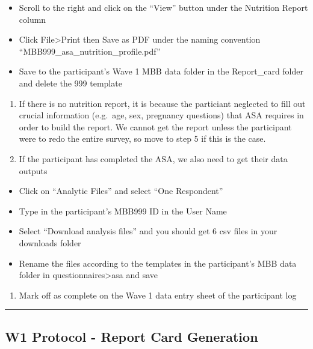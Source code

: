\documentclass[]{book}
\providecommand{\tightlist}{%
  \setlength{\itemsep}{0pt}\setlength{\parskip}{0pt}}
\begin{document}
\begin{itemize}
\tightlist
\item
  Scroll to the right and click on the ``View'' button under the Nutrition Report column
\item
  Click File\textgreater{}Print then Save as PDF under the naming convention ``MBB999\_asa\_nutrition\_profile.pdf''
\item
  Save to the participant's Wave 1 MBB data folder in the Report\_card folder and delete the 999 template
\end{itemize}

\begin{enumerate}
\def\labelenumi{\arabic{enumi}.}
\setcounter{enumi}{3}
\tightlist
\item
  If there is no nutrition report, it is because the particiant neglected to fill out crucial information (e.g.~age, sex, pregnancy questions) that ASA requires in order to build the report. We cannot get the report unless the participant were to redo the entire survey, so move to step 5 if this is the case.
\item
  If the participant has completed the ASA, we also need to get their data outputs
\end{enumerate}

\begin{itemize}
\tightlist
\item
  Click on ``Analytic Files'' and select ``One Respondent''
\item
  Type in the participant's MBB999 ID in the User Name
\item
  Select ``Download analysis files'' and you should get 6 csv files in your downloads folder
\item
  Rename the files according to the templates in the participant's MBB data folder in questionnaires\textgreater{}asa and save
\end{itemize}

\begin{enumerate}
\def\labelenumi{\arabic{enumi}.}
\setcounter{enumi}{5}
\tightlist
\item
  Mark off as complete on the Wave 1 data entry sheet of the participant log
\end{enumerate}

\begin{center}\rule{0.5\linewidth}{0.5pt}\end{center}

\hypertarget{w1-protocol---report-card-generation}{%
\subsection{W1 Protocol - Report Card Generation}\label{w1-protocol---report-card-generation}}
\end{document}

